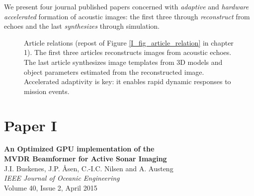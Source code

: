 %
% 


We present four journal published papers concerned with \emph{adaptive} and \emph{hardware accelerated} formation of acoustic images: the first three through \emph{reconstruct} from echoes and the last \emph{synthesizes} through simulation. 

\begin{figure}[tp]\label{III_fig_article_relation}
\caption{Article relations (repost of Figure \ref{I_fig_article_relation} in chapter 1). The first three articles reconstructs images from acoustic echoes. The last article synthesizes image templates from 3D models and object parameters estimated from the reconstructed image. Accelerated adaptivity is key: it enables rapid dynamic responses to mission events. }
\end{figure}


%
%


%

\section{Paper I}\label{sec:paperI} %
\textbf{An Optimized GPU implementation of the\\MVDR Beamformer for Active Sonar Imaging}~\cite{Buskenes2014}\\
J.I. Buskenes, J.P. Åsen, C.-I.C. Nilsen and A. Austeng\\
\textit{IEEE Journal of Oceanic Engineering}\\
Volume 40, Issue 2, April 2015

